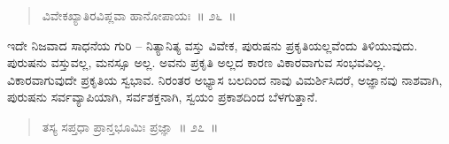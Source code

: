 \vspace{-0.3cm}

\begin{verse}
ವಿವೇಕಖ್ಯಾತಿರವಿಪ್ಲವಾ ಹಾನೋಪಾಯಃ~॥ ೨೬~॥
\end{verse}

\vspace{-0.3cm}


ಇದೇ ನಿಜವಾದ ಸಾಧನೆಯ ಗುರಿ – ನಿತ್ಯಾನಿತ್ಯ ವಸ್ತು ವಿವೇಕ, ಪುರುಷನು ಪ್ರಕೃತಿಯಲ್ಲವೆಂದು ತಿಳಿಯುವುದು. ಪುರುಷನು ವಸ್ತುವಲ್ಲ, ಮನಸ್ಸೂ ಅಲ್ಲ. ಅವನು ಪ್ರಕೃತಿ ಅಲ್ಲದ ಕಾರಣ ವಿಕಾರವಾಗುವ ಸಂಭವವಿಲ್ಲ. ವಿಕಾರವಾಗುವುದೇ ಪ್ರಕೃತಿಯ ಸ್ವಭಾವ. ನಿರಂತರ ಅಭ್ಯಾಸ ಬಲದಿಂದ ನಾವು ವಿಮರ್ಶಿಸಿದರೆ, ಅಜ್ಞಾನವು ನಾಶವಾಗಿ, ಪುರುಷನು ಸರ್ವವ್ಯಾಪಿಯಾಗಿ, ಸರ್ವಶಕ್ತನಾಗಿ, ಸ್ವಯಂ ಪ್ರಕಾಶದಿಂದ ಬೆಳಗುತ್ತಾನೆ. 

\vspace{-0.3cm}

\begin{verse}
ತಸ್ಯ ಸಪ್ತಧಾ ಪ್ರಾನ್ತಭೂಮಿಃ ಪ್ರಜ್ಞಾ~॥ ೨೭~॥
\end{verse}

\vspace{-0.3cm}


